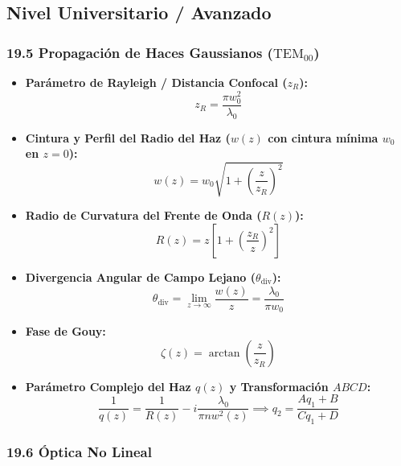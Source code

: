 \documentclass[11pt,a4paper]{article}
\begin{document}
\subsection*{Nivel Universitario / Avanzado}

\subsubsection*{19.5 Propagación de Haces Gaussianos ($\text{TEM}_{00}$)}

\begin{itemize}
  \item \textbf{Parámetro de Rayleigh / Distancia Confocal ($z_R$):}
  \[
    z_R = \frac{\pi w_0^2}{\lambda_0}
  \]
  \item \textbf{Cintura y Perfil del Radio del Haz ($w(z)$ con cintura mínima $w_0$ en $z=0$):}
  \[
    w(z) = w_0 \sqrt{1 + \left( \frac{z}{z_R} \right)^2}
  \]
  \item \textbf{Radio de Curvatura del Frente de Onda ($R(z)$):}
  \[
    R(z) = z \left[ 1 + \left( \frac{z_R}{z} \right)^2 \right]
  \]
  \item \textbf{Divergencia Angular de Campo Lejano ($\theta_{\text{div}}$):}
  \[
    \theta_{\text{div}} = \lim_{z \to \infty} \frac{w(z)}{z} = \frac{\lambda_0}{\pi w_0}
  \]
  \item \textbf{Fase de Gouy:}
  \[
    \zeta(z) = \arctan\left( \frac{z}{z_R} \right)
  \]
  \item \textbf{Parámetro Complejo del Haz $q(z)$ y Transformación $ABCD$:}
  \[
    \frac{1}{q(z)} = \frac{1}{R(z)} - i \frac{\lambda_0}{\pi n w^2(z)} \implies q_2 = \frac{A q_1 + B}{C q_1 + D}
  \]
\end{itemize}

\subsubsection*{19.6 Óptica No Lineal}
\end{document}
